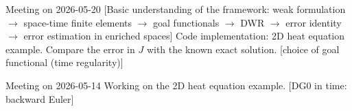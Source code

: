 \documentclass[11pt,a4paper]{article}
\begin{document}
\meet
{Meeting on 2026-05-20}
[Basic understanding of the framework: 
weak formulation $\rightarrow$ space-time finite elements $\rightarrow$ goal functionals $\rightarrow$ DWR $\rightarrow$ error identity $\rightarrow$ error estimation in enriched spaces]
{Code implementation: 2D heat equation example.
Compare the error in $J$ with the known exact solution.}
[choice of goal functional (time regularity)]
\vspace{1.5em}



\meet
{Meeting on 2026-05-14}
{Working on the 2D heat equation example.
}
[DG0 in time: backward Euler]
\end{document}
